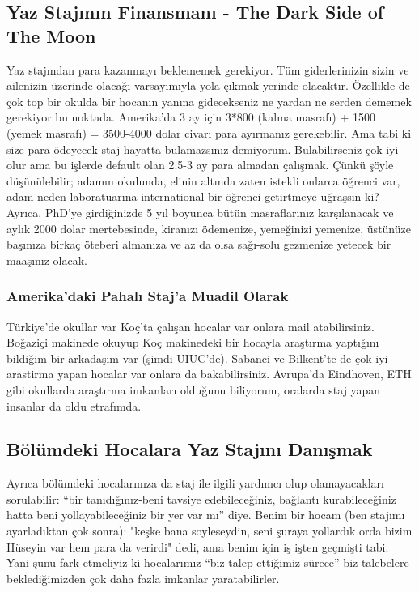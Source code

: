 \documentclass[12pt,a4paper]{article}
\begin{document}
\subsection{Yaz Stajının Finansmanı - The Dark Side of The Moon}
Yaz stajından para kazanmayı beklememek gerekiyor. Tüm giderlerinizin sizin ve ailenizin üzerinde olacağı varsayımıyla yola çıkmak yerinde olacaktır. Özellikle de çok top bir okulda bir hocanın yanına gidecekseniz ne yardan ne serden dememek gerekiyor bu noktada. Amerika’da 3 ay için 3*800 (kalma masrafı) + 1500 (yemek masrafı) = 3500-4000 dolar civarı para ayırmanız gerekebilir. Ama tabi ki size para ödeyecek staj hayatta bulamazsınız demiyorum. Bulabilirseniz çok iyi olur ama bu işlerde default olan 2.5-3 ay para almadan çalışmak. Çünkü şöyle düşünülebilir;  adamın okulunda, elinin altında zaten istekli onlarca öğrenci var, adam neden laboratuarına international bir öğrenci getirtmeye uğraşsın ki? Ayrıca, PhD’ye girdiğinizde 5 yıl boyunca bütün masraflarınız karşılanacak ve aylık 2000 dolar mertebesinde, kiranızı ödemenize, yemeğinizi yemenize, üstünüze başınıza birkaç öteberi almanıza ve az da olsa sağı-solu gezmenize yetecek bir maaşınız olacak.

\subsubsection{Amerika’daki Pahalı Staj’a Muadil Olarak}
Türkiye’de okullar var Koç'ta çalışan hocalar var onlara mail atabilirsiniz. Boğaziçi makinede okuyup Koç makinedeki bir hocayla araştırma yaptığını bildiğim bir arkadaşım var (şimdi UIUC’de). Sabanci ve Bilkent'te de çok iyi arastirma yapan hocalar var onlara da bakabilirsiniz. Avrupa’da Eindhoven, ETH gibi okullarda araştırma imkanları olduğunu biliyorum, oralarda staj yapan insanlar da oldu etrafımda.

\subsection{Bölümdeki Hocalara Yaz Stajını Danışmak}
Ayrıca bölümdeki hocalarınıza da staj ile ilgili yardımcı olup olamayacakları sorulabilir: “bir tanıdığınız-beni tavsiye edebileceğiniz, bağlantı kurabileceğiniz hatta beni yollayabileceğiniz bir yer var mı” diye. Benim bir hocam (ben stajımı ayarladıktan çok sonra): "keşke bana soyleseydin, seni şuraya yollardık orda bizim Hüseyin var hem para da verirdi" dedi, ama benim için iş işten geçmişti tabi. Yani şunu fark etmeliyiz ki hocalarımız “biz talep ettiğimiz sürece” biz talebelere beklediğimizden çok daha fazla imkanlar yaratabilirler.
\end{document}
